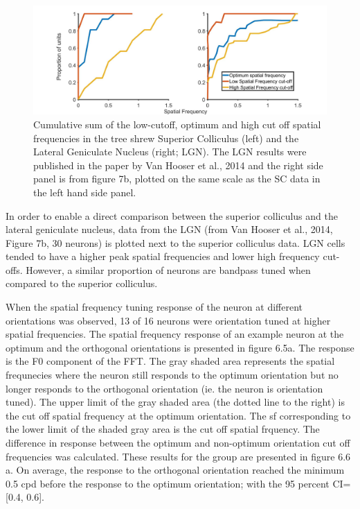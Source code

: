 \documentclass [12pt]{report}
\begin{document}
		\begin{figure}
			\includegraphics[width=\linewidth]{cumsum_sf_SC_LGN.jpg}
			\caption{Cumulative sum of the low-cutoff, optimum and high cut off spatial frequencies in the tree shrew Superior Colliculus (left) and the Lateral Geniculate Nucleus (right; LGN). The LGN results were published in the paper by Van Hooser et al., 2014 and the right side panel is from figure 7b, plotted on the same scale as the SC data in the left hand side panel.}
			\label{fig8:fig8}
		\end{figure}
	In order to enable a direct comparison between the superior colliculus and the lateral geniculate nucleus, data from the LGN (from Van Hooser et al., 2014, Figure 7b, 30 neurons) is plotted next to the superior colliculus data. LGN cells tended to have a higher peak spatial frequencies and lower high frequency cut-offs. However, a similar proportion of neurons are bandpass tuned when compared to the superior colliculus.
	
	When the spatial frequency tuning response of the neuron at different orientations was observed, 13 of 16 neurons were orientation tuned at higher spatial frequencies. The spatial frequency response of an example neuron at the optimum and the orthogonal orientations is presented in figure 6.5a. The response is the F0 component of the FFT. The gray shaded area represents the spatial frequnecies where the neuron still responds to the optimum orientation but no longer responds to the orthogonal orientation (ie. the neuron is orientation tuned).  The upper limit of the gray shaded area (the dotted line to the right) is the cut off spatial frequency at the optimum orientation. The sf corresponding to the lower limit of the shaded gray area is the cut off spatial frquency. The difference in response between the optimum and non-optimum orientation cut off frequencies was calculated. These results for the group are presented in figure 6.6 a. On average, the response to the orthogonal orientation reached the minimum 0.5 cpd before the response to the optimum orientation; with the 95 percent CI= [0.4, 0.6].
	
\end{document}
